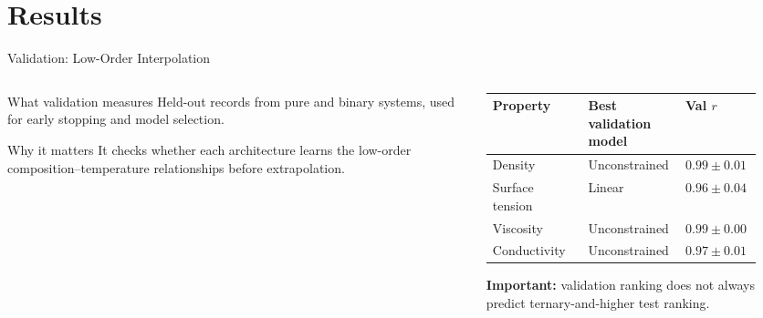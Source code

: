 \documentclass[aspectratio=169,10pt]{beamer}
\newcommand{\watchout}[1]{\textcolor{SaltOrange}{\textbf{#1}}}
\begin{document}
\section{Results}

\begin{frame}{Validation: Low-Order Interpolation}
  \begin{columns}[T,onlytextwidth]
    \begin{column}{0.49\textwidth}
      \begin{block}{What validation measures}
        Held-out records from pure and binary systems, used for early stopping and model selection.
      \end{block}
      \begin{block}{Why it matters}
        It checks whether each architecture learns the low-order composition--temperature relationships before extrapolation.
      \end{block}
    \end{column}
    \begin{column}{0.47\textwidth}
      \scriptsize
      \setlength{\tabcolsep}{3pt}
      \begin{tabular}{L{0.34\linewidth}L{0.32\linewidth}L{0.22\linewidth}}
        \toprule
        Property & Best validation model & Val $r$ \\
        \midrule
        Density & Unconstrained & $0.99\pm0.01$ \\
        Surface tension & Linear & $0.96\pm0.04$ \\
        Viscosity & Unconstrained & $0.99\pm0.00$ \\
        Conductivity & Unconstrained & $0.97\pm0.01$ \\
        \bottomrule
      \end{tabular}

      \vspace{0.35cm}
      \small
      \watchout{Important:} validation ranking does not always predict ternary-and-higher test ranking.
    \end{column}
  \end{columns}
\end{frame}
\end{document}
